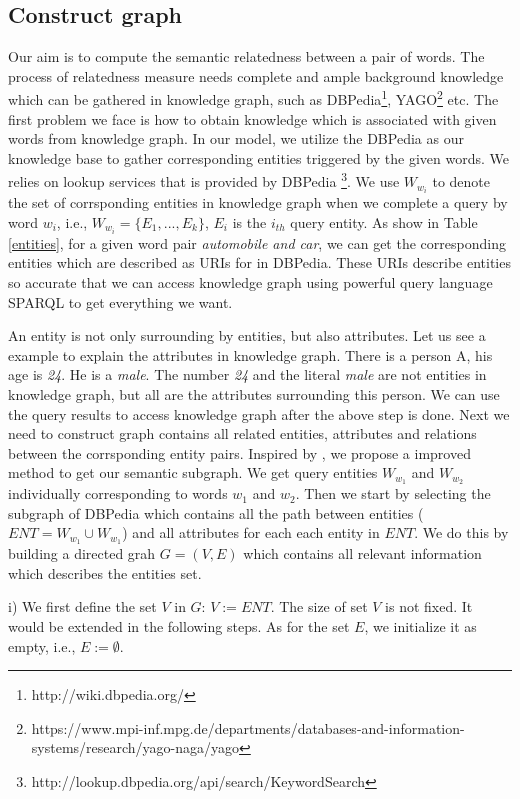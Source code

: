\subsection{Construct graph}
Our aim is to compute the semantic relatedness between a pair of words. The process of relatedness measure
needs complete and ample background knowledge which can be gathered in knowledge graph, such as
DBPedia\footnote{http://wiki.dbpedia.org/}, 
YAGO\footnote{https://www.mpi-inf.mpg.de/departments/databases-and-information-systems/research/yago-naga/yago} etc.
The first problem we face is how to obtain knowledge which is associated with given words from knowledge graph. 
In our model, we utilize the DBPedia as our knowledge base to gather corresponding entities triggered by the given words.
We relies on lookup services that is provided by DBPedia \footnote{http://lookup.dbpedia.org/api/search/KeywordSearch}. 
We use $W_{w_i}$ to denote the set of corrsponding entities in knowledge graph when we complete a query by word $w_i$,
i.e., $W_{w_i}=\{E_1,...,E_k\}$, $E_i$ is the $i_{th}$ query entity.
As show in Table \ref{entities}, for a given word pair \emph{automobile and car}, 
we can get the corresponding entities which are described as URIs for in DBPedia. 
These URIs describe entities so accurate that we can access knowledge graph using powerful query language SPARQL 
to get everything we want.

An entity is not only surrounding by entities, but also attributes. Let us see a example to explain the attributes 
in knowledge graph. There is a person A, his age is \emph{24}. He is a \emph{male}.
The number \emph{24} and the literal \emph{male} are not entities in knowledge graph,
but all are the attributes surrounding this person.
We can use the query results to access knowledge graph after the above step is done. Next we need to construct graph 
contains all related entities, attributes and relations between the corrsponding entity pairs. Inspired by \cite{aaai/NavigliP12},
we propose a improved method to get our semantic subgraph. We get query entities $W_{w_1}$ and $W_{w_2}$ individually
corresponding to words $w_1$ and $w_2$. 
Then we start by selecting the subgraph of DBPedia which contains all the path between entities
($ENT = W_{w_1} \cup W_{w_1}$) and all attributes for each each entity in $ENT$. We do 
this by building a directed grah ${G = (V, E)}$ which contains all relevant information which describes
the entities set.

i) We first define the set $V$ in $G$: $V:=ENT$. 
The size of set $V$ is not fixed. It would be extended in the following steps.
As for the set $E$, we initialize it as empty, i.e., $E:=\emptyset$.

